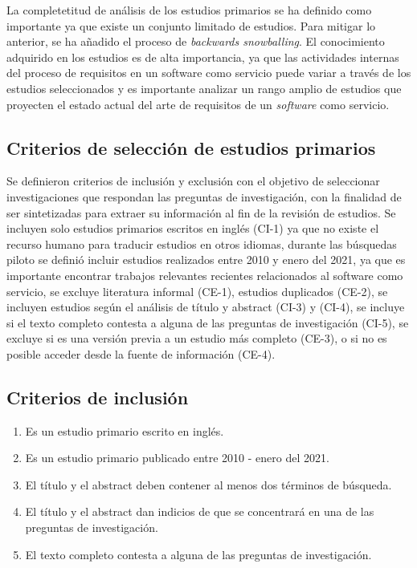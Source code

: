 \documentclass{article}
\begin{document}
La completetitud de análisis de los estudios primarios se ha definido como importante ya que 
existe un conjunto limitado de estudios. Para mitigar lo anterior, se ha añadido el proceso de 
\emph{backwards snowballing}.
El conocimiento adquirido en los estudios es de alta importancia, ya que las actividades 
internas del proceso de requisitos en un software como servicio puede variar a través de los estudios
seleccionados y es importante analizar un rango amplio de estudios que proyecten el estado actual del arte 
de requisitos de un \emph{software} como servicio. 

\subsection{Criterios de selección de estudios primarios}
Se definieron criterios de inclusión y exclusión con el objetivo 
de seleccionar investigaciones que respondan las preguntas de investigación, con la finalidad de ser  
sintetizadas para extraer su información al fin de la revisión de estudios.
Se incluyen solo estudios primarios escritos en inglés (CI-1) ya que no existe el
recurso humano para traducir estudios en otros idiomas, durante las búsquedas piloto 
se definió incluir estudios realizados entre 2010  y enero del 2021, ya que es importante
encontrar trabajos relevantes recientes relacionados al software como servicio, 
se excluye literatura informal (CE-1), estudios duplicados (CE-2), se incluyen 
estudios según el análisis de título y abstract (CI-3) y (CI-4),
se incluye si el texto completo contesta a alguna de las preguntas de investigación (CI-5), 
se excluye si es una versión previa a un estudio más completo (CE-3), o si no es posible acceder desde la fuente 
de información (CE-4).


\subsection{Criterios de inclusión}
\begin{enumerate}[C-1.-]
  \item{Es un estudio primario escrito en inglés.}
  \item{Es un estudio primario publicado entre 2010 - enero del 2021.}
  \item{El título y el abstract deben contener al menos dos términos de búsqueda.}
  \item{El título y el abstract dan indicios de que se concentrará en una de las preguntas de investigación.}
  \item{El texto completo contesta a alguna de las preguntas de investigación.}
\end{enumerate}
\end{document}
